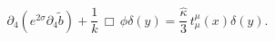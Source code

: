 \begin{equation}\label{contracted-44-1}
\partial_4\left(e^{2\sigma}\partial_4 \tilde b \right)+\frac{1}{k}
\,\Box\,\phi \delta(y)  = \frac{\hat \kappa}{3}\,
t_{\mu}^{\mu}(x)\delta(y).
\end{equation}

